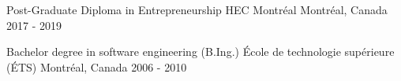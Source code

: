 
\begin{cventries}

  \cventry
    {Post-Graduate Diploma in Entrepreneurship} %
    {HEC Montréal} %
    {Montréal, Canada} %
    {2017 - 2019} %
    {}

  \cventry
    {Bachelor degree in software engineering (B.Ing.)} %
    {École de technologie supérieure (ÉTS)} %
    {Montréal, Canada} %
    {2006 - 2010} %
    {
    }


\end{cventries}